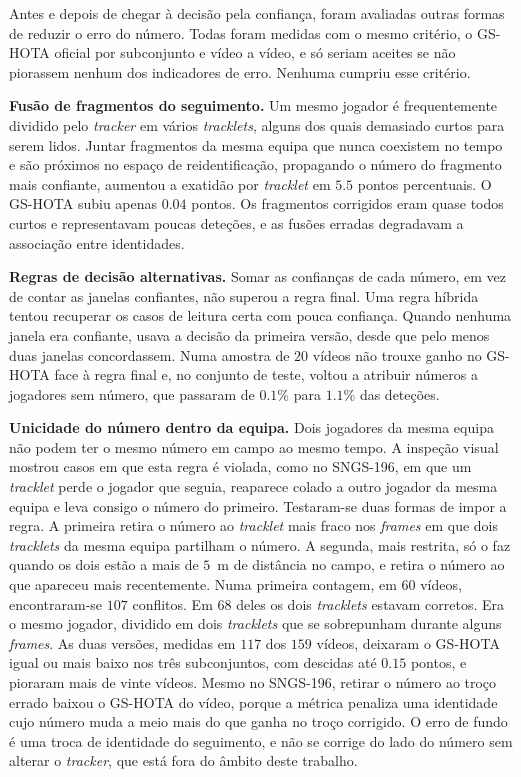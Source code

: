 Antes e depois de chegar à decisão pela confiança, foram avaliadas outras formas de reduzir o erro do número. Todas foram medidas com o mesmo critério, o GS-HOTA oficial por subconjunto e vídeo a vídeo, e só seriam aceites se não piorassem nenhum dos indicadores de erro. Nenhuma cumpriu esse critério.

\medskip\noindent\textbf{Fusão de fragmentos do seguimento.} Um mesmo jogador é frequentemente dividido pelo \emph{tracker} em vários \emph{tracklets}, alguns dos quais demasiado curtos para serem lidos. Juntar fragmentos da mesma equipa que nunca coexistem no tempo e são próximos no espaço de reidentificação, propagando o número do fragmento mais confiante, aumentou a exatidão por \emph{tracklet} em $5.5$ pontos percentuais. O GS-HOTA subiu apenas $0.04$ pontos. Os fragmentos corrigidos eram quase todos curtos e representavam poucas deteções, e as fusões erradas degradavam a associação entre identidades.

\medskip\noindent\textbf{Regras de decisão alternativas.} Somar as confianças de cada número, em vez de contar as janelas confiantes, não superou a regra final. Uma regra híbrida tentou recuperar os casos de leitura certa com pouca confiança. Quando nenhuma janela era confiante, usava a decisão da primeira versão, desde que pelo menos duas janelas concordassem. Numa amostra de $20$ vídeos não trouxe ganho no GS-HOTA face à regra final e, no conjunto de teste, voltou a atribuir números a jogadores sem número, que passaram de $0.1\%$ para $1.1\%$ das deteções.

\medskip\noindent\textbf{Unicidade do número dentro da equipa.} Dois jogadores da mesma equipa não podem ter o mesmo número em campo ao mesmo tempo. A inspeção visual mostrou casos em que esta regra é violada, como no SNGS-196, em que um \emph{tracklet} perde o jogador que seguia, reaparece colado a outro jogador da mesma equipa e leva consigo o número do primeiro. Testaram-se duas formas de impor a regra. A primeira retira o número ao \emph{tracklet} mais fraco nos \emph{frames} em que dois \emph{tracklets} da mesma equipa partilham o número. A segunda, mais restrita, só o faz quando os dois estão a mais de $5$~m de distância no campo, e retira o número ao que apareceu mais recentemente. Numa primeira contagem, em $60$ vídeos, encontraram-se $107$ conflitos. Em $68$ deles os dois \emph{tracklets} estavam corretos. Era o mesmo jogador, dividido em dois \emph{tracklets} que se sobrepunham durante alguns \emph{frames}. As duas versões, medidas em $117$ dos $159$ vídeos, deixaram o GS-HOTA igual ou mais baixo nos três subconjuntos, com descidas até $0.15$ pontos, e pioraram mais de vinte vídeos. Mesmo no SNGS-196, retirar o número ao troço errado baixou o GS-HOTA do vídeo, porque a métrica penaliza uma identidade cujo número muda a meio mais do que ganha no troço corrigido. O erro de fundo é uma troca de identidade do seguimento, e não se corrige do lado do número sem alterar o \emph{tracker}, que está fora do âmbito deste trabalho.

